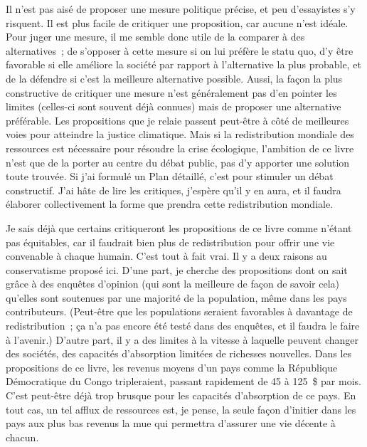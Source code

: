 \documentclass[a5paper,french,openany]{memoir}
\begin{document}
Il n'est pas aisé de proposer une mesure politique précise, et peu d'essayistes s'y risquent. Il est plus facile de critiquer une proposition, car aucune n'est idéale. Pour juger une mesure, il me semble donc utile de la comparer à des alternatives~; de s'opposer à cette mesure si on lui préfère le statu quo, d'y être favorable si elle améliore la société par rapport à l'alternative la plus probable, et de la défendre si c'est la meilleure alternative possible. Aussi, la façon la plus constructive de critiquer une mesure n'est généralement pas d'en pointer les limites (celles-ci sont souvent déjà connues) mais de proposer une alternative préférable. 
Les propositions que je relaie %
passent peut-être 
à côté de meilleures voies pour atteindre la justice climatique. %
Mais si la redistribution mondiale des ressources est nécessaire pour résoudre la crise écologique, l'ambition de ce livre n'est que de la porter au centre du débat public, %
pas d'y apporter une solution toute trouvée. Si j'ai formulé un Plan détaillé, c'est pour stimuler un débat constructif. J'ai hâte de lire les critiques, j'espère qu'il y en aura, et il faudra élaborer collectivement la forme que prendra cette redistribution mondiale. 

Je sais déjà que certains critiqueront les propositions de ce livre comme n'étant pas équitables, car il faudrait bien plus de redistribution pour offrir une vie convenable %
à chaque humain. C'est tout à fait vrai. Il y a deux raisons au conservatisme proposé ici. D'une part, je cherche des propositions dont on sait grâce à des enquêtes d'opinion (qui sont la meilleure de façon de savoir cela) qu'elles sont soutenues par une majorité de la population, même dans les pays contributeurs. (Peut-être que les populations seraient favorables à davantage de redistribution~; ça n'a pas encore été testé dans des enquêtes, et il faudra le faire à l'avenir.) D'autre part, il y a des limites à la vitesse à laquelle peuvent changer des sociétés, des capacités d'absorption limitées de richesses nouvelles. Dans les propositions de ce livre, les revenus moyens d'un pays comme la République Démocratique du Congo tripleraient, passant rapidement de 45 à 125~\$ par mois. C'est peut-être déjà trop brusque pour les capacités d'absorption de ce pays. En tout cas, un tel afflux de ressources est, je pense, la seule façon d'initier dans les pays aux plus bas revenus la mue qui permettra d'assurer une vie décente à chacun. 
\end{document}
